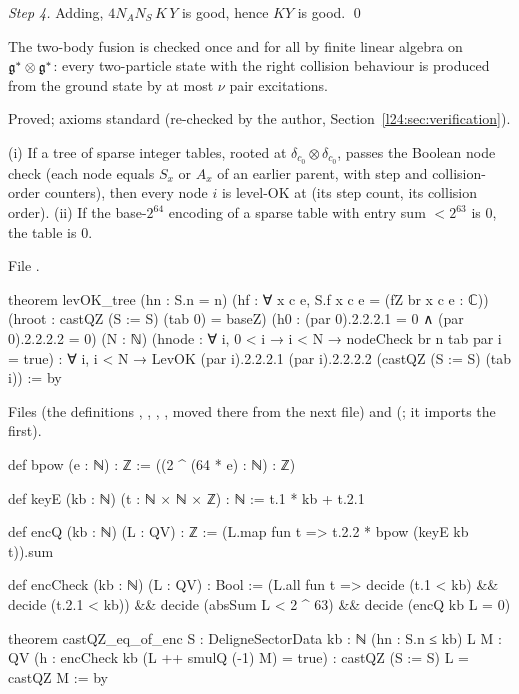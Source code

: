 \emph{Step 4.} Adding, $4N_AN_S\,K\,Y$ is good, hence $KY$ is good. \qed

\begin{physics}
The two-body fusion is checked once and for all by finite linear algebra on $\mathfrak g^*\otimes\mathfrak g^*$: every
two-particle state with the right collision behaviour is produced from the ground state by at most $\nu$ pair
excitations.
\end{physics}

\begin{status}
Proved; axioms standard (re-checked by the author, Section~\ref{l24:sec:verification}).
\end{status}

\begin{theorem}\label{l24:thm:sparse}
(i) If a tree of sparse integer tables, rooted at $\delta_{c_0}\otimes\delta_{c_0}$, passes the Boolean node check (each
node equals $S_x$ or $A_x$ of an earlier parent, with step and collision-order counters), then every node $i$ is level-OK at
(its step count, its collision order). (ii) If the base-$2^{64}$ encoding of a sparse table with entry sum $<2^{63}$ is $0$, the table is
$0$.
\end{theorem}
\noindent File .
\begin{leancode}
theorem levOK_tree (hn : S.n = n) (hf : ∀ x c e, S.f x c e = (fZ br x c e : ℂ))
    (hroot : castQZ (S := S) (tab 0) = baseZ) (h0 : (par 0).2.2.2.1 = 0 ∧ (par 0).2.2.2.2 = 0)
    (N : ℕ) (hnode : ∀ i, 0 < i → i < N → nodeCheck br n tab par i = true) :
    ∀ i, i < N → LevOK (par i).2.2.2.1 (par i).2.2.2.2 (castQZ (S := S) (tab i)) := by
\end{leancode}
\noindent Files  (the definitions ,
, , , moved there from the next file) and
 (; it imports the first).
\begin{leancode}
def bpow (e : ℕ) : ℤ := ((2 ^ (64 * e) : ℕ) : ℤ)

def keyE (kb : ℕ) (t : ℕ × ℕ × ℤ) : ℕ := t.1 * kb + t.2.1

def encQ (kb : ℕ) (L : QV) : ℤ := (L.map fun t => t.2.2 * bpow (keyE kb t)).sum

def encCheck (kb : ℕ) (L : QV) : Bool :=
  (L.all fun t => decide (t.1 < kb) && decide (t.2.1 < kb)) && decide (absSum L < 2 ^ 63) &&
    decide (encQ kb L = 0)

theorem castQZ_eq_of_enc {S : DeligneSectorData} {kb : ℕ} (hn : S.n ≤ kb) {L M : QV}
    (h : encCheck kb (L ++ smulQ (-1) M) = true) : castQZ (S := S) L = castQZ M := by
\end{leancode}

